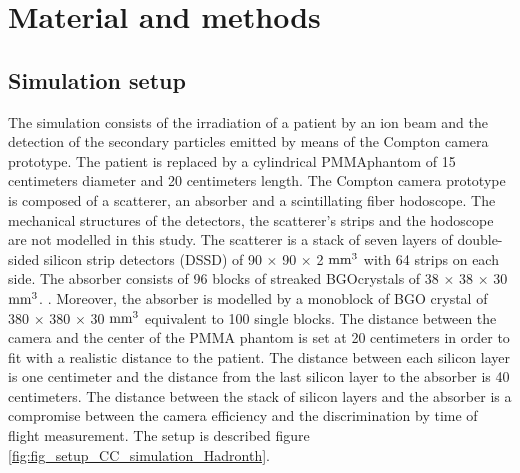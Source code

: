 \documentclass[12pt]{iopart}
\begin{document}

\section{Material and methods}

\subsection{Simulation setup\newline}

The simulation consists of the irradiation of a patient by an ion beam and the detection of the secondary particles emitted by means of the Compton camera prototype. The patient is replaced by a cylindrical PMMA\footnotemark[1] phantom of 15 centimeters diameter and 20 centimeters length. The Compton camera prototype is composed of a scatterer, an absorber and a scintillating fiber hodoscope. The mechanical structures of the detectors, the scatterer's strips and the hodoscope are not modelled in this study. The scatterer is a stack of seven layers of double-sided silicon strip detectors (DSSD) of 90 $\times$ 90 $\times$ 2 $\rm{mm}^3$ with 64 strips on each side. The absorber consists of 96 blocks of streaked BGO\footnotemark[2] crystals of 38 $\times$ 38 $\times$ 30 $\rm{mm}^3$. . Moreover, the absorber is modelled by a monoblock of BGO crystal of 380 $\times$ 380 $\times$ 30 $\rm{mm}^3$ equivalent to 100 single blocks. The distance between the camera and the center of the PMMA phantom is set at 20 centimeters in order to fit with a realistic distance to the patient. The distance between each silicon layer is one centimeter and the distance from the last silicon layer to the absorber is 40 centimeters. The distance between the stack of silicon layers and the absorber is a compromise between the camera efficiency and the discrimination by time of flight measurement. The setup is described figure \ref{fig:fig_setup_CC_simulation_Hadronth}.\newline
\end{document}
